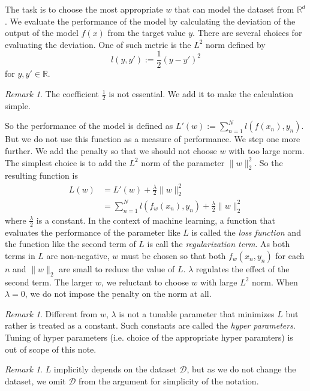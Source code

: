 \documentclass{amsart}
\theoremstyle{definition}
\theoremstyle{remark}
\newtheorem{remark}[theorem]{Remark}
\numberwithin{equation}{section}
\begin{document}
The task is to choose the most appropriate $w$ that can model the dataset from $\mathbb{R}^d$.
We evaluate the performance of the model by calculating the deviation of the
output of the model $f(x)$ from the target value $y$.
There are several choices for evaluating the deviation.
One of such metric is the $L^2$ norm defined by
\begin{equation}
l(y, y') := \frac{1}{2}(y-y')^2
\end{equation}
for $y, y'\in \mathbb{R}$.

\begin{remark}
The coefficient $\frac{1}{2}$ is not essential.
We add it to make the calculation simple.
\end{remark}

So the performance of the model is defined as
$L'(w) := \sum_{n=1}^N l(f(x_n), y_n)$.
But we do not use this function as a measure of performance.
We step one more further.
We add the penalty so that we should not choose $w$ with too large norm.
The simplest choice is to add the $L^2$ norm of the parameter $\|w\|_2^2$.
So the resulting function is
\begin{equation}
\begin{split}
L(w) &= L'(w) + \frac{\lambda}{2} \|w\|_2^2 \\
     &= \sum_{n=1}^N l(f_w(x_n), y_n) + \frac{\lambda}{2} \|w\|_2^2
\end{split}
\end{equation}
where $\frac{\lambda}{2}$ is a constant.
In the context of machine learning, a function that evaluates the performance of
the parameter like $L$ is called the \textit{loss function}
and the function like the second term of $L$ is call the \textit{regularization term}.
As both terms in $L$ are non-negative, $w$ must be chosen so that both
$f_w(x_n, y_n)$ for each $n$ and $\|w\|_2$ are small to reduce the value of $L$.
$\lambda$ regulates the effect of the second term.
The larger $w$, we reluctant to choose $w$ with large $L^2$ norm.
When $\lambda = 0$, we do not impose the penalty on the norm at all.

\begin{remark}
Different from $w$, $\lambda$ is not a tunable parameter that minimizes $L$
but rather is treated as a constant.
Such constants are called the \textit{hyper parameters}.
Tuning of hyper parameters (i.e. choice of the appropriate hyper paramters)
is out of scope of this note.
\end{remark}

\begin{remark}
$L$ implicitly depends on the dataset $\mathcal{D}$, but as we do not change the
dataset, we omit $\mathcal{D}$ from the argument for simplicity of the notation.
\end{remark}
\end{document}
